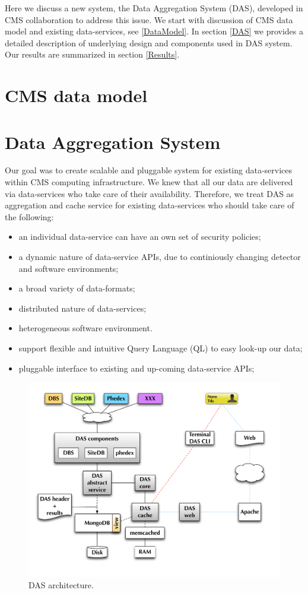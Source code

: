 \documentclass[a4paper]{jpconf}
\begin{document}
Here we discuss a new system, the Data Aggregation System (DAS),
developed in CMS collaboration to address this issue. We start with
discussion of CMS data model and existing data-services, see \ref{DataModel}. 
In section \ref{DAS}
we provides a detailed description of underlying design and components
used in DAS system. Our results are summarized in section \ref{Results}.

\section{CMS data model\label{DataModel}}
\section{Data Aggregation System\label{DAS}}
Our goal was to create scalable and pluggable system for existing data-services
within CMS computing infrastructure. We knew that all our data are delivered 
via data-services who take care of their availability. Therefore, we treat 
DAS as aggregation and cache service for existing data-services who should
take care of the following:
\begin{itemize}
\item an individual data-service can have an own set of security policies;
\item a dynamic nature of data-service APIs, due to continiously changing
detector and software environments;
\item a broad variety of data-formats;
\item distributed nature of data-services;
\item heterogeneous software environment.
\item support flexible and intuitive Query Language (QL) to easy look-up our
data;
\item pluggable interface to existing and up-coming data-service APIs;
\end{itemize}

\begin{figure}[htb]
\centering
\includegraphics[width=150mm]{DAS_architecture.pdf}
\caption{
DAS architecture.
}
\label{DAS_arch}
\end{figure}
\end{document}
